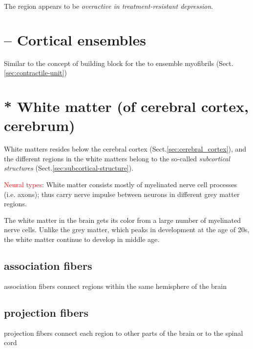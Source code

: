 The region appears to be {\it overactive in treatment-resistant depression}.


\section{-- Cortical ensembles}
\label{sec:cortical-ensembles}

Similar to the concept of building block for the to ensemble myofibrils
(Sect.\ref{sec:contractile-unit})

\section{* White matter (of cerebral cortex, cerebrum)}
\label{sec:white-matter-cerebrum}
\label{sec:white-matter}

White matters resides below the cerebral cortex
(Sect.\ref{sec:cerebral_cortex}), and the different regions in the white
matters belong to the so-called {\it subcortical structures}
(Sect.\ref{sec:subcortical-structure}).

% 



\textcolor{red}{Neural types}: White matter consists mostly of myelinated nerve
cell processes (i.e. axons); thus carry nerve impulse between neurons in
different grey matter regions.

The white matter in the brain gets its color from a large number of myelinated
nerve cells. Unlike the grey matter, which peaks in development at the age of
20s, the white matter continue to develop in middle age.

\subsection{association fibers}
\label{sec:association-fibers}

 association fibers connect regions within the same hemisphere of the brain

\subsection{projection fibers}
\label{sec:projection-fibers}

projection fibers connect each region to other parts of the brain or to the
spinal cord

